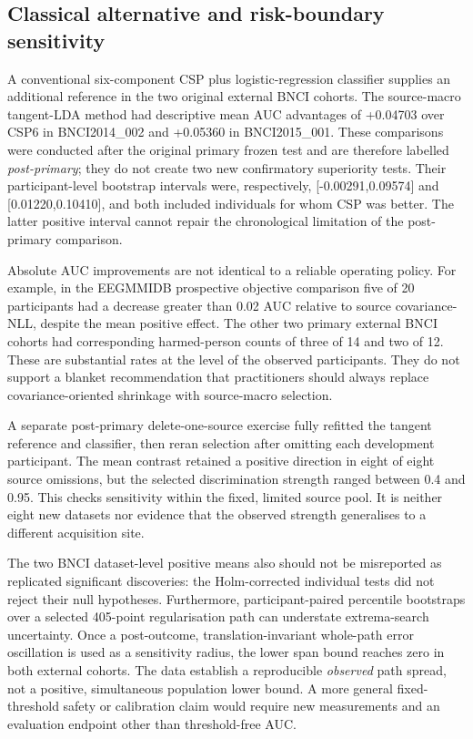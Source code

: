 
\subsection{Classical alternative and risk-boundary sensitivity}
A conventional six-component CSP plus logistic-regression
classifier supplies an additional reference in the two original
external BNCI cohorts. The source-macro tangent-LDA method
had descriptive mean AUC advantages of +0.04703 over CSP6 in
BNCI2014\_002 and +0.05360 in BNCI2015\_001. These
comparisons were conducted after the original primary frozen
test and are therefore labelled \emph{post-primary}; they do
not create two new confirmatory superiority tests. Their
participant-level bootstrap intervals were, respectively,
[-0.00291,0.09574] and [0.01220,0.10410], and both
included individuals for whom CSP was better. The latter
positive interval cannot repair the chronological limitation
of the post-primary comparison.

Absolute AUC improvements are not identical to a reliable
operating policy. For example, in the EEGMMIDB prospective
objective comparison five of 20 participants had a decrease
greater than 0.02 AUC relative to source covariance-NLL,
despite the mean positive effect. The other two primary
external BNCI cohorts had corresponding harmed-person counts
of three of 14 and two of 12. These are substantial rates
at the level of the observed participants. They do not
support a blanket recommendation that practitioners
should always replace covariance-oriented shrinkage with
source-macro selection.

A separate post-primary delete-one-source exercise fully
refitted the tangent reference and classifier, then reran
selection after omitting each development participant.
The mean contrast retained a positive direction in eight
of eight source omissions, but the selected discrimination
strength ranged between 0.4 and 0.95. This checks sensitivity
within the fixed, limited source pool. It is neither eight
new datasets nor evidence that the observed strength
generalises to a different acquisition site.

The two BNCI dataset-level positive means also should not be
misreported as replicated significant discoveries: the
Holm-corrected individual tests did not reject their null
hypotheses. Furthermore, participant-paired percentile
bootstraps over a selected 405-point regularisation path
can understate extrema-search uncertainty. Once a
post-outcome, translation-invariant whole-path error
oscillation is used as a sensitivity radius, the lower
span bound reaches zero in both external cohorts. The
data establish a reproducible \emph{observed} path spread,
not a positive, simultaneous population lower bound.
A more general fixed-threshold safety or calibration
claim would require new measurements and an evaluation
endpoint other than threshold-free AUC.
